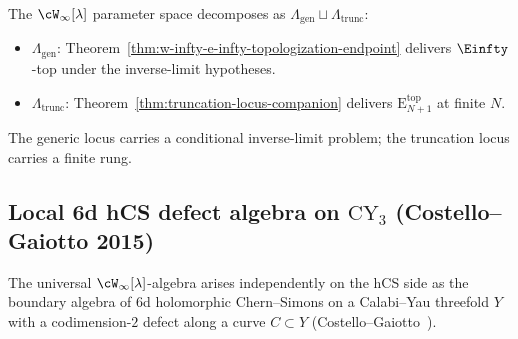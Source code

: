 \begin{remark}
\label{rem:complete-scope}
The $\cW_\infty[\lambda]$ parameter space decomposes as
$\Lambda_{\mathrm{gen}} \sqcup \Lambda_{\mathrm{trunc}}$:
\begin{itemize}
\item $\Lambda_{\mathrm{gen}}$:
 Theorem~\ref{thm:w-infty-e-infty-topologization-endpoint}
 delivers $\Einfty$-top under the inverse-limit hypotheses.
\item $\Lambda_{\mathrm{trunc}}$:
 Theorem~\ref{thm:truncation-locus-companion} delivers
 $\mathrm{E}_{N+1}^{\mathrm{top}}$ at finite $N$.
\end{itemize}
The generic locus carries a conditional inverse-limit problem;
the truncation locus carries a finite rung.
\end{remark}

\subsection{Local 6d hCS defect algebra on
\texorpdfstring{$\mathrm{CY}_3$}{CY3} (Costello--Gaiotto 2015)}
\label{subsec:cross-volume-6d-hcs}

The universal $\cW_\infty[\lambda]$-algebra arises independently
on the hCS side as the boundary algebra of $6$d holomorphic
Chern--Simons on a Calabi--Yau threefold $Y$ with a
codimension-$2$ defect along a curve $C \subset Y$
\textup{(}Costello--Gaiotto~\cite{costello-gaiotto-6d-hCS}\textup{)}.

